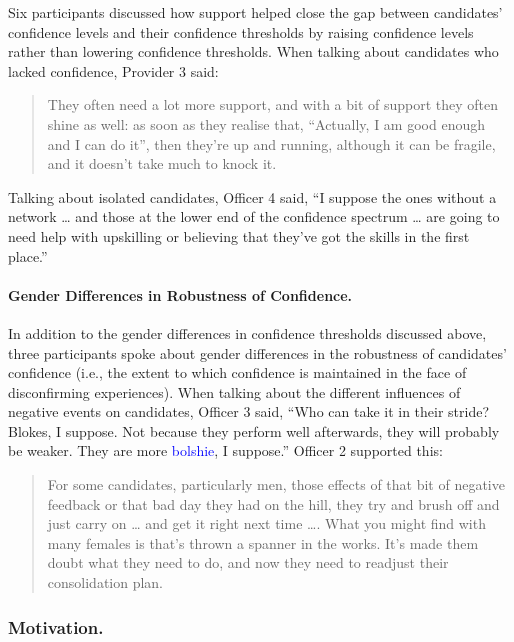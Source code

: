 \documentclass[
  12pt,
  a4paper,
]{book}
\begin{document}
Six participants discussed how support helped close the gap between candidates' confidence levels and their confidence thresholds by raising confidence levels rather than lowering confidence thresholds. When talking about candidates who lacked confidence, Provider 3 said:

\begin{quote}
They often need a lot more support, and with a bit of support they often shine as well: as soon as they realise that, ``Actually, I am good enough and I can do it'', then they're up and running, although it can be fragile, and it doesn't take much to knock it.
\end{quote}

Talking about isolated candidates, Officer 4 said, ``I suppose the ones without a network \ldots{} and those at the lower end of the confidence spectrum \ldots{} are going to need help with upskilling or believing that they've got the skills in the first place.''

\hypertarget{qual-gender-diffs-robsut-conf}{%
\paragraph{Gender Differences in Robustness of Confidence.}\label{qual-gender-diffs-robsut-conf}}

In addition to the gender differences in confidence thresholds discussed above, three participants spoke about gender differences in the robustness of candidates' confidence (i.e., the extent to which confidence is maintained in the face of disconfirming experiences). When talking about the different influences of negative events on candidates, Officer 3 said, ``Who can take it in their stride? Blokes, I suppose. Not because they perform well afterwards, they will probably be weaker. They are more \textcolor{blue}{bolshie}, I suppose.'' Officer 2 supported this:

\begin{quote}
For some candidates, particularly men, those effects of that bit of negative feedback or that bad day they had on the hill, they try and brush off and just carry on \ldots{} and get it right next time \ldots. What you might find with many females is that's thrown a spanner in the works. It's made them doubt what they need to do, and now they need to readjust their consolidation plan.
\end{quote}

\hypertarget{qual-gta-motivation}{%
\subsubsection{Motivation.}\label{qual-gta-motivation}}
\end{document}
